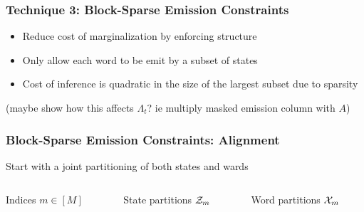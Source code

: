 \documentclass{beamer}
\begin{document}
\begin{frame}
\frametitle{Technique 3: Block-Sparse Emission Constraints}
\begin{itemize}
\item Reduce cost of marginalization by enforcing structure
\vspace{2em}
\item Only allow each word to be emit by a subset of states
\vspace{2em}
\item Cost of inference is quadratic in the size of the largest subset
    due to sparsity
\end{itemize}
(maybe show how this affects $\Lambda_t$? ie multiply masked emission column with $A$)
\end{frame}

\begin{frame}
\frametitle{Block-Sparse Emission Constraints: Alignment}
Start with a joint partitioning of both states and wards
\vspace{2em}

\centering
\begin{columns}
\begin{column}{0.33\textwidth}
\centering
Indices $m \in [M]$
\end{column}
\begin{column}{0.33\textwidth}
\centering
State partitions $\mathcal{Z}_m$
\end{column}
\begin{column}{0.33\textwidth}
\centering
Word partitions $\mathcal{X}_m$
\end{column}
\end{columns}

\begin{center}
\end{center}
\end{frame}
\end{document}
